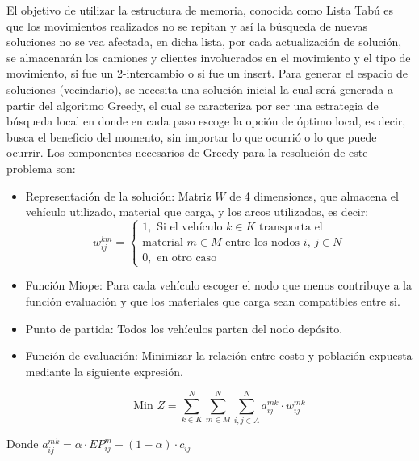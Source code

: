 \documentclass[conference]{IEEEtran}
\begin{document}
El objetivo de utilizar la estructura de memoria, conocida como Lista Tab\'u es que los movimientos realizados no se repitan y as\'i la b\'usqueda de nuevas soluciones no se vea afectada, en dicha lista, por cada actualizaci\'on de soluci\'on, se almacenar\'an los camiones y clientes involucrados en el movimiento y el tipo de movimiento, si fue un 2-intercambio o si fue un insert. Para generar el espacio de soluciones (vecindario), se necesita una soluci\'on inicial la cual ser\'a generada a partir del algoritmo Greedy, el cual se caracteriza por ser una estrategia de b\'usqueda local en donde en cada paso escoge la opci\'on de \'optimo local, es decir, busca el beneficio del momento, sin importar lo que ocurri\'o o lo que puede ocurrir. Los componentes necesarios de Greedy para la resoluci\'on de este problema son:

\begin{itemize}
    \item Representaci\'on de la soluci\'on: Matriz $W$ de 4 dimensiones, que almacena el veh\'iculo utilizado, material que carga, y los arcos utilizados, es decir:
   \\
   \begin{equation*}
        w^{km}_{ij} =     
    \begin{cases}
      1, \text{ Si el  veh\'iculo $k$} \in \text{$K$ transporta   el} \\  \text{material $m$} \in \text{$M$} \text{   entre los nodos $i$, $j$} \in \text{$N$}
      \\
      0, \text{ en otro caso}
    \end{cases}
    \end{equation*}
    \item Funci\'on Miope: Para cada veh\'iculo escoger el nodo que menos contribuye a la funci\'on evaluaci\'on y que los materiales que carga sean compatibles entre si.
    \item Punto de partida: Todos los veh\'iculos parten del nodo dep\'osito.
    \item Funci\'on de evaluaci\'on: Minimizar la relaci\'on entre costo y poblaci\'on expuesta mediante la siguiente expresi\'on.
    
    \begin{equation}
            \text{Min } Z = \sum_{k \in K}^N \sum_{m \in M}^N \sum_{i,j \in A}^N a^{mk}_{ij} \cdot w^{mk}_{ij}
    \end{equation}
\end{itemize}

Donde $a^{mk}_{ij} = \alpha \cdot EP^m_{ij} + (1 - \alpha) \cdot c_{ij} $
\\
\end{document}
